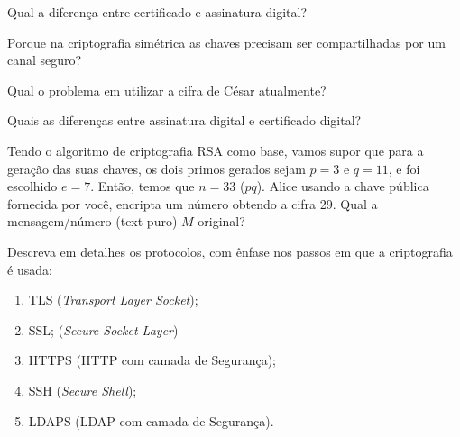 \exercise Qual a diferença entre certificado e assinatura digital?

\exercise  Porque na criptografia simétrica as chaves precisam ser
compartilhadas por um canal seguro?

\exercise Qual o problema em utilizar a cifra de César
atualmente?

\exercise  Quais as diferenças entre assinatura digital e
certificado digital?

\exercise Tendo o algoritmo de criptografia RSA como base,
vamos supor que para a geração das suas chaves, os dois primos gerados
sejam $p=3$ e $q=11$, e foi escolhido $e=7$. Então, temos que $n=33$
($pq$). Alice usando a chave pública fornecida por você, encripta um
número obtendo a cifra 29. Qual a mensagem/número (text puro) $M$
original?


\exercise Descreva em detalhes os protocolos, com ênfase nos 
passos em que a criptografia é usada:

\begin{enumerate}
    \item TLS ({\it Transport Layer Socket});
    \item SSL; ({\it Secure Socket Layer})
    \item HTTPS ({HTTP com camada de Segurança});
    \item SSH ({\it Secure Shell});
    \item LDAPS ({LDAP com camada de Segurança}).
\end{enumerate}